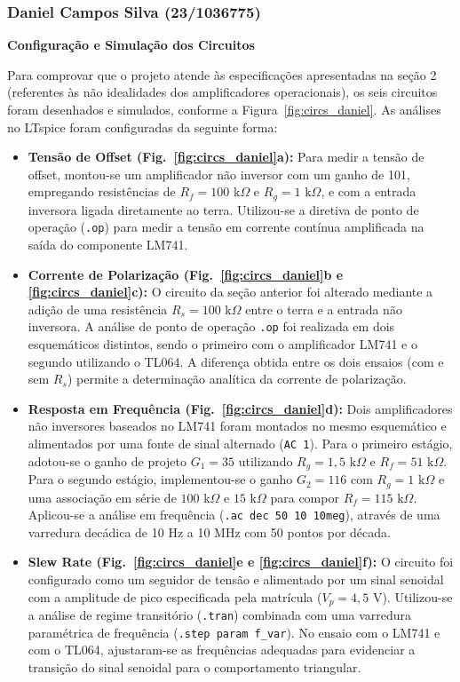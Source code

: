 \documentclass[11pt,a4paper]{article}
\begin{document}
\subsubsection{Daniel Campos Silva (23/1036775)}

\textbf{Configuração e Simulação dos Circuitos}

Para comprovar que o projeto atende às especificações apresentadas na seção 2 (referentes às não idealidades dos amplificadores operacionais), os seis circuitos foram desenhados e simulados, conforme a Figura~\ref{fig:circs_daniel}. As análises no LTspice foram configuradas da seguinte forma:

\begin{itemize}
    \item \textbf{Tensão de Offset (Fig.~\ref{fig:circs_daniel}a):} Para medir a tensão de offset, montou-se um amplificador não inversor com um ganho de 101, empregando resistências de $R_f=100\text{ k}\Omega$ e $R_g=1\text{ k}\Omega$, e com a entrada inversora ligada diretamente ao terra. Utilizou-se a diretiva de ponto de operação (\texttt{.op}) para medir a tensão em corrente contínua amplificada na saída do componente LM741.
    
    \item \textbf{Corrente de Polarização (Fig.~\ref{fig:circs_daniel}b e \ref{fig:circs_daniel}c):} O circuito da seção anterior foi alterado mediante a adição de uma resistência $R_s=100\text{ k}\Omega$ entre o terra e a entrada não inversora. A análise de ponto de operação \texttt{.op} foi realizada em dois esquemáticos distintos, sendo o primeiro com o amplificador LM741 e o segundo utilizando o TL064. A diferença obtida entre os dois ensaios (com e sem $R_s$) permite a determinação analítica da corrente de polarização.

    \item \textbf{Resposta em Frequência (Fig.~\ref{fig:circs_daniel}d):} Dois amplificadores não inversores baseados no LM741 foram montados no mesmo esquemático e alimentados por uma fonte de sinal alternado (\texttt{AC 1}). Para o primeiro estágio, adotou-se o ganho de projeto $G_1 = 35$ utilizando $R_g=1{,}5\text{ k}\Omega$ e $R_f=51\text{ k}\Omega$. Para o segundo estágio, implementou-se o ganho $G_2 = 116$ com $R_g=1\text{ k}\Omega$ e uma associação em série de $100\text{ k}\Omega$ e $15\text{ k}\Omega$ para compor $R_f=115\text{ k}\Omega$. Aplicou-se a análise em frequência (\texttt{.ac dec 50 10 10meg}), através de uma varredura decádica de 10 Hz a 10 MHz com 50 pontos por década.     
    
    \item \textbf{Slew Rate (Fig.~\ref{fig:circs_daniel}e e \ref{fig:circs_daniel}f):} O circuito foi configurado como um seguidor de tensão e alimentado por um sinal senoidal com a amplitude de pico especificada pela matrícula ($V_p=4{,}5\text{ V}$). Utilizou-se a análise de regime transitório (\texttt{.tran}) combinada com uma varredura paramétrica de frequência (\texttt{.step param f\_var}). No ensaio com o LM741 e com o TL064, ajustaram-se as frequências adequadas para evidenciar a transição do sinal senoidal para o comportamento triangular. 
\end{itemize}
\end{document}

